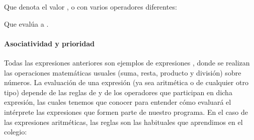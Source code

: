 \documentclass[a4paper,12pt,spanish]{sphinxmanual}
\begin{document}
Que denota el valor , o con varios operadores diferentes:

%
\begin{sphinxVerbatim}[commandchars=\\\{\}]
    
\end{sphinxVerbatim}

Que evalúa a .


\paragraph{Asociatividad y prioridad}
\label{\detokenize{php:asociatividad-y-prioridad}}
\ignorespaces 
Todas las expresiones anteriores son ejemplos de expresiones ,
donde se realizan las operaciones matemáticas usuales (suma, resta, producto y
división) sobre números. La evaluación de una expresión (ya sea aritmética o de
cualquier otro tipo) depende de las reglas de  y 
de los operadores que participan en dicha expresión, las cuales tenemos que
conocer para entender cómo evaluará el intérprete las expresiones que formen
parte de nuestro programa. En el caso de las expresiones aritméticas, las
reglas son las habituales que aprendimos en el colegio:
\end{document}
